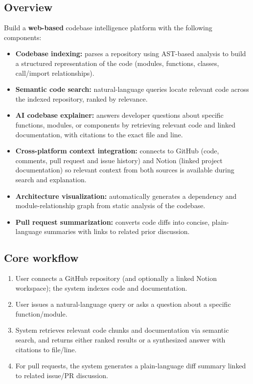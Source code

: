 \documentclass[11pt,a4paper]{article}
\begin{document}
\subsection{Overview}
Build a \textbf{web-based} codebase intelligence platform with the following components:
\begin{itemize}[leftmargin=0.7cm]
    \item \textbf{Codebase indexing:} parses a repository using AST-based analysis to build a structured representation of the code (modules, functions, classes, call/import relationships).
    \item \textbf{Semantic code search:} natural-language queries locate relevant code across the indexed repository, ranked by relevance.
    \item \textbf{AI codebase explainer:} answers developer questions about specific functions, modules, or components by retrieving relevant code and linked documentation, with citations to the exact file and line.
    \item \textbf{Cross-platform context integration:} connects to GitHub (code, comments, pull request and issue history) and Notion (linked project documentation) so relevant context from both sources is available during search and explanation.
    \item \textbf{Architecture visualization:} automatically generates a dependency and module-relationship graph from static analysis of the codebase.
    \item \textbf{Pull request summarization:} converts code diffs into concise, plain-language summaries with links to related prior discussion.
\end{itemize}

\subsection{Core workflow}
\begin{enumerate}[leftmargin=0.7cm]
    \item User connects a GitHub repository (and optionally a linked Notion workspace); the system indexes code and documentation.
    \item User issues a natural-language query or asks a question about a specific function/module.
    \item System retrieves relevant code chunks and documentation via semantic search, and returns either ranked results or a synthesized answer with citations to file/line.
    \item For pull requests, the system generates a plain-language diff summary linked to related issue/PR discussion.
\end{enumerate}
\end{document}
